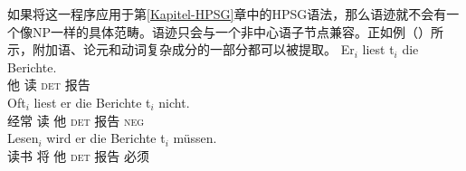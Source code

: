 如果将这一程序应用于第\ref{Kapitel-HPSG}章中的HPSG\indexhpsgc 语法，那么语迹就不会有一个像NP一样的具体范畴。语迹只会与一个非中心语子节点兼容。正如例（）所示，附加语、论元和动词复杂成分的一部分都可以被提取。
\eal
\ex 
\gll Er$_i$ liest t$_i$ die Berichte.\\
	 他 读 {}    \textsc{det} 报告\\
\ex 
\gll Oft$_i$ liest er die Berichte t$_i$ nicht.\\
	 经常 读 他 \textsc{det} 报告 {} \textsc{neg}\\
\ex 
\gll Lesen$_i$ wird er die Berichte t$_i$ müssen.\\
	 读书 将 他 \textsc{det} 报告 {} 必须\\
\zl

